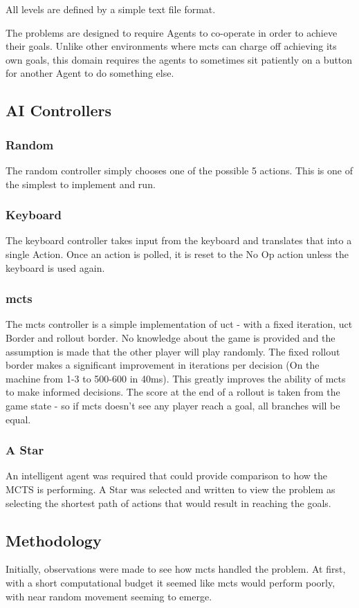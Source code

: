 \documentclass{IEEEtran}
\begin{document}
All levels are defined by a simple text file format.

The problems are designed to require Agents to co-operate in order to achieve their goals. Unlike other environments where \gls{mcts} can charge off achieving its own goals, this domain requires the agents to sometimes sit patiently on a button for another Agent to do something else.

\subsection{AI Controllers}
\subsubsection{Random}
The random controller simply chooses one of the possible 5 actions. This is one of the simplest to implement and run.
\subsubsection{Keyboard}
The keyboard controller takes input from the keyboard and translates that into a single Action. Once an action is polled, it is reset to the No Op action unless the keyboard is used again. 
\subsubsection{\gls{mcts}}
The \gls{mcts} controller is a simple implementation of \gls{uct} - with a fixed iteration, \gls{uct} Border and rollout border. No knowledge about the game is provided and the assumption is made that the other player will play randomly. The fixed rollout border makes a significant improvement in iterations per decision (On the machine from 1-3 to 500-600 in 40ms). This greatly improves the ability of \gls{mcts} to make informed decisions. The score at the end of a rollout is taken from the game state - so if \gls{mcts} doesn't see any player reach a goal, all branches will be equal.
\subsubsection{A Star}
An intelligent agent was required that could provide comparison to how the MCTS is performing. A Star was selected and written to view the problem as selecting the shortest path of actions that would result in reaching the goals.

\subsection{Methodology}
Initially, observations were made to see how \gls{mcts} handled the problem. At first, with a short computational budget it seemed like \gls{mcts} would perform poorly, with near random movement seeming to emerge.
\end{document}
